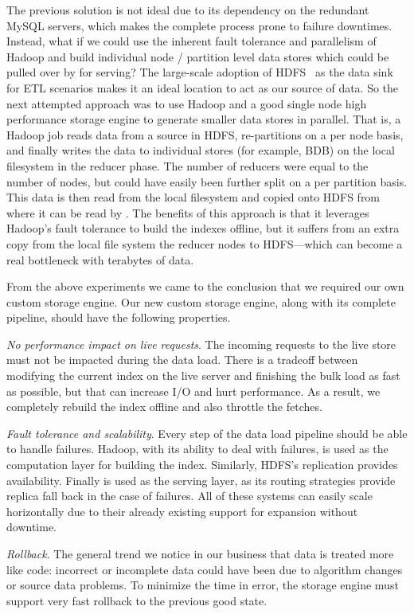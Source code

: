 The previous solution is not ideal due to its dependency on the
redundant MySQL servers, which makes the complete process prone to
failure downtimes. Instead, what if we could use the inherent fault
tolerance and parallelism of Hadoop and build individual node /
partition level data stores which could be pulled over by
\projectname{} for serving? The large-scale adoption of HDFS~\cite{hdfs}
 as the data sink for ETL scenarios makes it an ideal location to 
act as our source of data.
So the next attempted approach was to use Hadoop and a good single
node high performance storage engine to generate smaller data
stores in parallel. That is, a Hadoop job reads data from a source in
HDFS, re-partitions on a per node basis, and finally writes the data
to individual stores (for example, BDB) on the local filesystem in the
reducer phase. The number of reducers were equal to the number of
nodes, but could have easily been further split on a per partition
basis. This data is then read from the local filesystem and copied
onto HDFS from where it can be read by \projectname{}. The benefits of
this approach is that it leverages Hadoop's fault tolerance to build
the indexes offline, but it suffers from an extra copy from the local
file system the reducer nodes to HDFS---which can become a real
bottleneck with terabytes of data. 

From the above experiments we came to the conclusion that we required
our own custom storage engine. Our new custom storage engine, along
with its complete pipeline, should have the following properties. 
\begin{compactitem}
\item \emph{No performance impact on live requests}. The incoming
requests to the live store must not be impacted during the data load.
There is a tradeoff between modifying the current index on the live
server and finishing the bulk load as fast as possible, but that can
increase I/O and hurt performance. As a result, we completely rebuild
the index offline and also throttle the fetches. 
\item \emph{Fault tolerance and scalability}. Every step of the data
load pipeline should be able to handle failures. Hadoop, with its
ability to deal with failures, is used as the computation layer for
building the index. Similarly, HDFS's replication provides
availability. Finally \projectname{} is used as the serving layer, as
its routing strategies provide replica fall back in the case of
failures. All of these systems can easily scale horizontally due to
their already existing support for expansion without downtime. 
\item \emph{Rollback}. The general trend we notice in our business
that data is treated more like code: incorrect or incomplete data
could have been due to algorithm changes or source data problems. To
minimize the time in error, the storage engine must support very fast
rollback to the previous good state. 
\end{compactitem}


